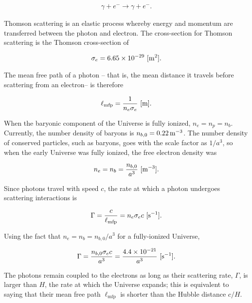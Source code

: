 \documentclass[a4paper,11pt]{article}
\begin{document}
\begin{align*}
    \gamma + e^{-} \rightarrow \gamma + e^{-}.
\end{align*}

{\noindent}Thomson scattering is an elastic process whereby energy and momentum are transferred between the photon and electron. The cross-section for Thomson scattering is the Thomson cross-section of 

\begin{align*}
    \sigma_e = 6.65 \times 10^{-29} ~ [{\rm m^2}].
\end{align*}

{\noindent}The mean free path of a photon -- that is, the mean distance it travels before scattering from an electron-- is therefore

\begin{align*}
    \ell_\mathrm{mfp} = \frac{1}{n_e\sigma_e} ~ [{\rm m}].
\end{align*}

{\noindent}When the baryonic component of the Universe is fully ionized, $n_e = n_p = n_b$. Currently, the number density of baryons is $n_{b,0} = 0.22\,{\rm m^{-3}}$. The number density of conserved particles, such as baryons, goes with the scale factor as $1/a^3$, so when the early Universe was fully ionized, the free electron density was

\begin{align*}
    n_e = n_b = \frac{n_{b,0}}{a^3} ~ [{\rm m^{-3}}].
\end{align*}

{\noindent}Since photons travel with speed $c$, the rate at which a photon undergoes scattering interactions is

\begin{align*}
    \Gamma = \frac{c}{\ell_\mathrm{mfp}} = n_e\sigma_ec ~ [{\rm s^{-1}}].
\end{align*}

{\noindent}Using the fact that $n_e = n_b = n_{b,0}/a^3$ for a fully-ionized Universe,

\begin{align*}
    \Gamma = \frac{n_{b,0}\sigma_ec}{a^3} = \frac{4.4\times10^{-21}}{a^3} ~ [{\rm s^{-1}}].
\end{align*}

{\noindent}The photons remain coupled to the electrons as long as their scattering rate, $\Gamma$, is larger than $H$, the rate at which the Universe expands; this is equivalent to saying that their mean free path $\ell_\mathrm{mfp}$ is shorter than the Hubble distance $c/H$.
\end{document}
